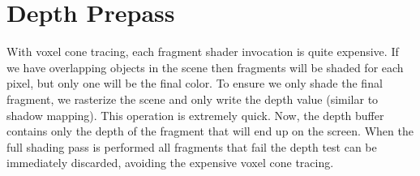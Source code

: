 \section{Depth Prepass}
With voxel cone tracing, each fragment shader invocation is quite expensive. If we have overlapping objects in the scene then fragments will be shaded for each pixel, but only one will be the final color. To ensure we only shade the final fragment, we rasterize the scene and only write the depth value (similar to shadow mapping). This operation is extremely quick. Now, the depth buffer contains only the depth of the fragment that will end up on the screen. When the full shading pass is performed all fragments that fail the depth test can be immediately discarded, avoiding the expensive voxel cone tracing.
